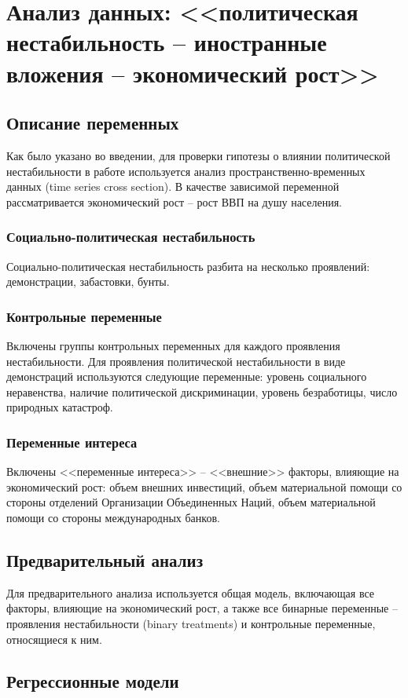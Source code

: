 \documentclass[14pt]{extarticle} %
\begin{document}
\section{Анализ данных: <<политическая нестабильность -- иностранные вложения – экономический рост>>}
\subsection{Описание переменных}
Как было указано во введении, для проверки гипотезы о влиянии политической нестабильности в работе используется анализ пространственно-временных данных (time series cross section). В качестве зависимой переменной рассматривается экономический рост – рост ВВП на душу населения. 
\subsubsection{Социально-политическая нестабильность}
Социально-политическая нестабильность разбита на несколько проявлений: демонстрации, забастовки, бунты. 
\subsubsection{Контрольные переменные}
Включены группы контрольных переменных для каждого проявления нестабильности. Для проявления политической нестабильности в  виде демонстраций используются следующие переменные: уровень социального неравенства, наличие политической дискриминации, уровень безработицы, число природных катастроф. 
\subsubsection{Переменные интереса}
Включены <<переменные интереса>> -- <<внешние>> факторы, влияющие на экономический рост: объем внешних инвестиций, объем материальной помощи со стороны отделений Организации Объединенных Наций, объем материальной помощи со стороны международных банков. 
\subsection{Предварительный анализ}
Для предварительного анализа используется общая модель, включающая все факторы, влияющие на экономический рост, а также все бинарные переменные -- проявления нестабильности  (binary treatments) и контрольные переменные, относящиеся к ним. 
\subsection{Регрессионные модели}
\end{document}
